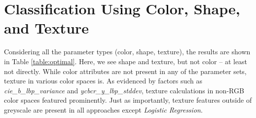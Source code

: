 \documentclass[letterpaper, notitlepage]{report}
\begin{document}
%
%
%

\section{Classification Using Color, Shape, and Texture}
Considering all the parameter types (color, shape, texture), the results are shown in Table \ref{table:optimal}. Here, we see shape and texture, but not color -- at least not directly. While color attributes are not present in any of the parameter sets, texture in various color spaces is. As evidenced by factors such as \textit{cie\_b\_lbp\_variance} and \textit{ycbcr\_y\_lbp\_stddev}, texture calculations in non-RGB color spaces featured prominently. Just as importantly, texture features outside of greyscale are present in all approaches except \textit{Logistic Regression}.
\end{document}
